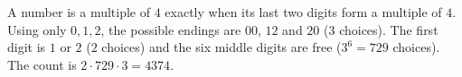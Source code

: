 A number is a multiple of $4$ exactly when its last two digits form a multiple of $4$. Using only $0,1,2$, the possible endings are $00$, $12$ and $20$ ($3$ choices). The first digit is $1$ or $2$ ($2$ choices) and the six middle digits are free ($3^6=729$ choices). The count is $2\cdot729\cdot3=\boxed{4374}$.

